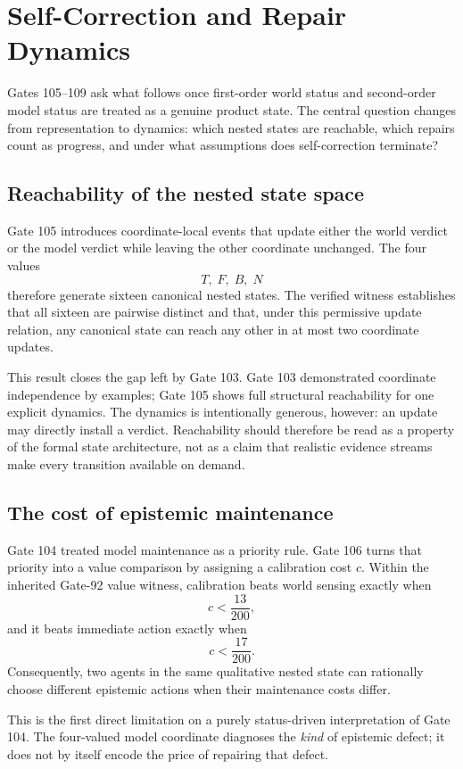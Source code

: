\section{Self-Correction and Repair Dynamics}

Gates 105--109 ask what follows once first-order world status and second-order model status are treated as a genuine product state. The central question changes from representation to dynamics: which nested states are reachable, which repairs count as progress, and under what assumptions does self-correction terminate?

\subsection{Reachability of the nested state space}

Gate 105 introduces coordinate-local events that update either the world verdict or the model verdict while leaving the other coordinate unchanged. The four values
\[
T,\;F,\;B,\;N
\]
therefore generate sixteen canonical nested states. The verified witness establishes that all sixteen are pairwise distinct and that, under this permissive update relation, any canonical state can reach any other in at most two coordinate updates.

This result closes the gap left by Gate 103. Gate 103 demonstrated coordinate independence by examples; Gate 105 shows full structural reachability for one explicit dynamics. The dynamics is intentionally generous, however: an update may directly install a verdict. Reachability should therefore be read as a property of the formal state architecture, not as a claim that realistic evidence streams make every transition available on demand.

\subsection{The cost of epistemic maintenance}

Gate 104 treated model maintenance as a priority rule. Gate 106 turns that priority into a value comparison by assigning a calibration cost $c$. Within the inherited Gate-92 value witness, calibration beats world sensing exactly when
\[
c<\frac{13}{200},
\]
and it beats immediate action exactly when
\[
c<\frac{17}{200}.
\]
Consequently, two agents in the same qualitative nested state can rationally choose different epistemic actions when their maintenance costs differ.

This is the first direct limitation on a purely status-driven interpretation of Gate 104. The four-valued model coordinate diagnoses the \emph{kind} of epistemic defect; it does not by itself encode the price of repairing that defect.

